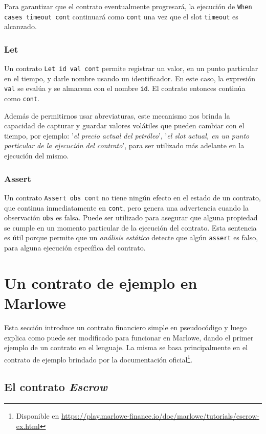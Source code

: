 \documentclass[12pt]{book}
\begin{document}
Para garantizar que el contrato eventualmente progresará, la ejecución de \texttt{When cases timeout cont} continuará como \texttt{cont} una vez que el slot \texttt{timeout} es alcanzado.

\subsubsection{Let}

Un contrato \texttt{Let id val cont} permite registrar un valor, en un punto particular en el tiempo, y darle nombre usando un identificador. En este caso, la expresión \texttt{val} se evalúa y se almacena con el nombre \texttt{id}. El contrato entonces continúa como \texttt{cont}.

Además de permitirnos usar abreviaturas, este mecanismo nos brinda la capacidad de capturar y guardar valores volátiles que pueden cambiar con el tiempo, por ejemplo: '\textit{el precio actual del petróleo}', '\textit{el slot actual, en un punto particular de la ejecución del contrato}', para ser utilizado más adelante en la ejecución del mismo.

\subsubsection{Assert}
Un contrato \texttt{Assert obs cont} no tiene ningún efecto en el estado de un contrato, que continua inmediatamente en \texttt{cont}, pero genera una advertencia cuando la observación \texttt{obs} es falsa. Puede ser utilizado para asegurar que alguna propiedad se cumple en un momento particular de la ejecución del contrato. Esta sentencia es útil porque permite que un \textit{análisis estático} detecte que algún \texttt{assert} es falso, para alguna ejecución específica del contrato.


\section{Un contrato de ejemplo en Marlowe}

Esta sección introduce un contrato financiero simple en pseudocódigo y luego explica como puede ser modificado para funcionar en Marlowe, dando el primer ejemplo de un contrato en el lenguaje. La misma se basa principalmente en el contrato de ejemplo brindado por la documentación oficial\footnote{Disponible en \url{https://play.marlowe-finance.io/doc/marlowe/tutorials/escrow-ex.html}}.

\subsection{El contrato \textit{Escrow}}
\end{document}
